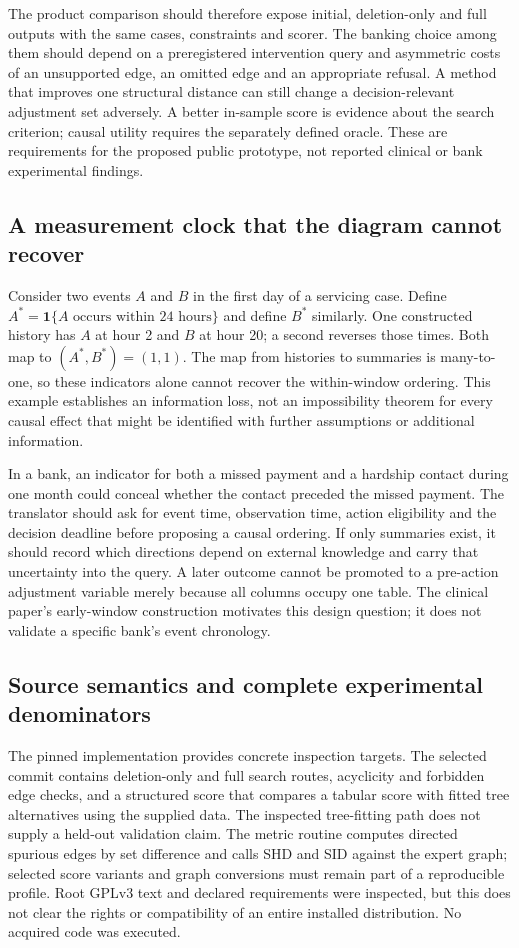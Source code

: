 The product comparison should therefore expose initial, deletion-only and full
outputs with the same cases, constraints and scorer. The banking choice among
them should depend on a preregistered intervention query and asymmetric costs
of an unsupported edge, an omitted edge and an appropriate refusal. A method
that improves one structural distance can still change a decision-relevant
adjustment set adversely. A better in-sample score is evidence about the search
criterion; causal utility requires the separately defined oracle. These are
requirements for the proposed public prototype, not reported clinical or bank
experimental findings.\citep{exec24_ecmo_reference}

\subsection{A measurement clock that the diagram cannot recover}
Consider two events $A$ and $B$ in the first day of a servicing case. Define
$A^*=\mathbf{1}\{A\text{ occurs within 24 hours}\}$ and define $B^*$
similarly. One constructed history has $A$ at hour 2 and $B$ at hour 20; a
second reverses those times. Both map to $(A^*,B^*)=(1,1)$. The map from
histories to summaries is many-to-one, so these indicators alone cannot
recover the within-window ordering. This example establishes an information
loss, not an impossibility theorem for every causal effect that might be
identified with further assumptions or additional information.
\citep{exec24_ecmo_reference}

In a bank, an indicator for both a missed payment and a hardship contact during
one month could conceal whether the contact preceded the missed payment. The
translator should ask for event time, observation time, action eligibility and
the decision deadline before proposing a causal ordering. If only summaries
exist, it should record which directions depend on external knowledge and
carry that uncertainty into the query. A later outcome cannot be promoted
to a pre-action adjustment variable merely because all columns occupy one
table. The clinical paper's early-window construction motivates this design
question; it does not validate a specific bank's event chronology.
\citep{exec24_ecmo_original,exec24_ecmo_reference}

\subsection{Source semantics and complete experimental denominators}
The pinned implementation provides concrete inspection targets. The selected
commit contains deletion-only and full search routes, acyclicity and forbidden
edge checks, and a structured score that compares a tabular score with fitted
tree alternatives using the supplied data. The inspected tree-fitting path
does not supply a held-out validation claim. The metric routine computes
directed spurious edges by set difference and calls SHD and SID against the
expert graph; selected score variants and graph conversions must remain part
of a reproducible profile. Root GPLv3 text and declared requirements were
inspected, but this does not clear the rights or compatibility of an entire
installed distribution. No acquired code was executed.
\citep{exec24_ecmo_code}


